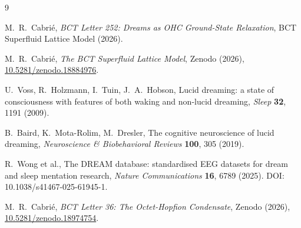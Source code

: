 \documentclass[aps,prl,twocolumn,showpacs,preprintnumbers]{revtex4-2}
\begin{document}
\begin{thebibliography}{9}

M.~R.\ Cabri\'e,
\textit{BCT Letter 252: Dreams as OHC Ground-State Relaxation},
BCT Superfluid Lattice Model (2026).

M.~R.\ Cabri\'e,
\textit{The BCT Superfluid Lattice Model},
Zenodo (2026),
\href{https://doi.org/10.5281/zenodo.18884976}{10.5281/zenodo.18884976}.

U.~Voss, R.~Holzmann, I.~Tuin, J.~A.\ Hobson,
Lucid dreaming: a state of consciousness with features of
both waking and non-lucid dreaming,
\textit{Sleep} \textbf{32}, 1191 (2009).

B.~Baird, K.~Mota-Rolim, M.~Dresler,
The cognitive neuroscience of lucid dreaming,
\textit{Neuroscience \& Biobehavioral Reviews}
\textbf{100}, 305 (2019).

R.~Wong et al.,
The DREAM database: standardised EEG datasets for
dream and sleep mentation research,
\textit{Nature Communications} \textbf{16}, 6789 (2025).
DOI: 10.1038/s41467-025-61945-1.

M.~R.\ Cabri\'e,
\textit{BCT Letter 36: The Octet-Hopfion Condensate},
Zenodo (2026),
\href{https://doi.org/10.5281/zenodo.18974754}{10.5281/zenodo.18974754}.

\end{thebibliography}
\end{document}
